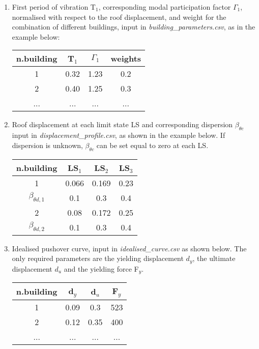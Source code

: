 \begin{enumerate}
\item First period of vibration T$_1$, corresponding modal participation factor $\Gamma_1$, normalised with respect to the roof displacement, and weight for the combination of different buildings, input in \textit{building\_parameters.csv}, as in the example below:
	\begin{table}[!htbp]
	\centering
	\begin{tabular}{|c|c|c|c|} \hline
	\textbf{n.building} & \textbf{T$_1$} & \textbf{$\Gamma_1$} & \textbf{weights}\\ \hline
	1 & 0.32 & 1.23 & 0.2\\ \hline
	2 & 0.40 & 1.25 & 0.3\\ \hline
	... & ... & ... & ... \\ \hline
	\end{tabular}
	\end{table}
	
\item Roof displacement at each limit state LS and corresponding dispersion $\beta_{\theta c}$ input in \textit{displacement\_profile.csv}, as shown in the example below. If dispersion is unknown, $\beta_{\theta c}$ can be set equal to zero at each LS.
	\begin{table}[!htbp]
	\centering
	\begin{tabular}{|c|c|c|c|} \hline
	\textbf{n.building} & \textbf{LS$_1$} &	\textbf{LS$_2$} &	\textbf{LS$_3$} \\ \hline
	1 & 0.066 & 0.169 & 0.23\\ \hline
	$\beta_{\theta d, 1}$ & 0.1 & 0.3 & 0.4\\ \hline
	2 & 0.08 & 0.172 & 0.25\\ \hline
	$\beta_{\theta d, 2}$ & 0.1 & 0.3 & 0.4\\ \hline	
	\end{tabular}
	\end{table}
	
\item Idealised pushover curve, input in \textit{idealised\_curve.csv} as shown below. The only required parameters are the yielding displacement $d_y$, the ultimate displacement $d_u$ and the yielding force F$_y$.

\begin{table}[!htbp]
\centering
\begin{tabular}{|c|c|c|c|} \hline
\textbf{n.building} & \textbf{d$_y$} & \textbf{d$_u$} & \textbf{F$_y$} \\ \hline
1 & 0.09	& 0.3	 & 523\\ \hline
2 & 0.12	& 0.35	 & 400\\ \hline
... & ...	& ... & ...\\ \hline
\end{tabular}
\end{table}


\end{enumerate}
